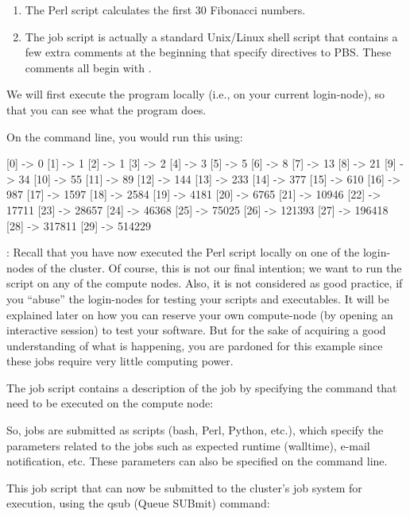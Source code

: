 \begin{enumerate}
\item  The Perl script calculates the first 30 Fibonacci numbers.
\item  The job script is actually a standard Unix/Linux shell script that
  contains a few extra comments at the beginning that specify directives to
  PBS.  These comments all begin with .
\end{enumerate}

We will first execute the program locally (i.e., on your current login-node),
so that you can see what the program does.

On the command line, you would run this using:

\begin{prompt}
[0] -> 0
[1] -> 1
[2] -> 1
[3] -> 2
[4] -> 3
[5] -> 5
[6] -> 8
[7] -> 13
[8] -> 21
[9] -> 34
[10] -> 55
[11] -> 89
[12] -> 144
[13] -> 233
[14] -> 377
[15] -> 610
[16] -> 987
[17] -> 1597
[18] -> 2584
[19] -> 4181
[20] -> 6765
[21] -> 10946
[22] -> 17711
[23] -> 28657
[24] -> 46368
[25] -> 75025
[26] -> 121393
[27] -> 196418
[28] -> 317811
[29] -> 514229
\end{prompt}

: Recall that you have now executed the Perl script locally on
one of the login-nodes of the \hpc cluster.  Of course, this is not our final
intention; we want to run the script on any of the compute nodes. Also, it is
not considered as good practice, if you ``abuse'' the login-nodes for testing
your scripts and executables. It will be explained later on how you can
reserve your own compute-node (by opening an interactive session) to test
your software. But for the sake of acquiring a good understanding of what is
happening, you are pardoned for this example since these jobs require very little
computing power.

The job script contains a description of the job by specifying the command that
need to be executed on the compute node:


So, jobs are submitted as scripts (bash, Perl, Python, etc.), which specify the
parameters related to the jobs such as expected runtime (walltime), e-mail
notification, etc. These parameters can also be specified on the command line.

This job script that can now be submitted to the cluster's job system for
execution, using the qsub (Queue SUBmit) command:

